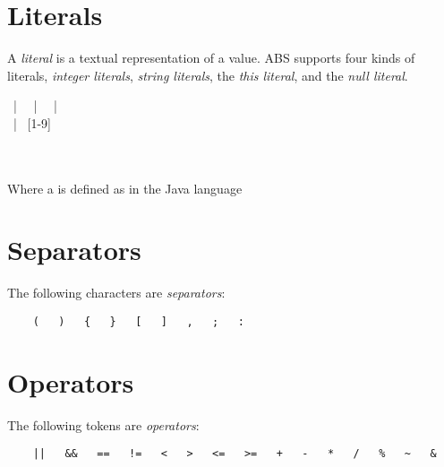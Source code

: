 \section{Literals}
A \emph{literal} is a textual representation of a value.
ABS supports four kinds of literals, \emph{integer literals}, \emph{string literals}, the \emph{this literal}, and the \emph{null literal}.

\begin{abssyntax}
        {}
                ~|~ 
                ~|~ 
                ~|~ 
                \\
     ~|~ [1-9]\MANY{[0-9]}\\
  {}  \\
    {}\\
    {}
\end{abssyntax}

\noindent
Where a  is defined as in the Java language \cite[p.~28]{gosling96}

\section{Separators}
The following characters are \emph{separators}:
\begin{verbatim}
    (   )   {   }   [   ]   ,   ;   :
\end{verbatim}

\section{Operators}
The following tokens are \emph{operators}:
\begin{verbatim}
    ||   &&   ==   !=   <   >   <=   >=   +   -   *   /   %   ~   &   
\end{verbatim}
